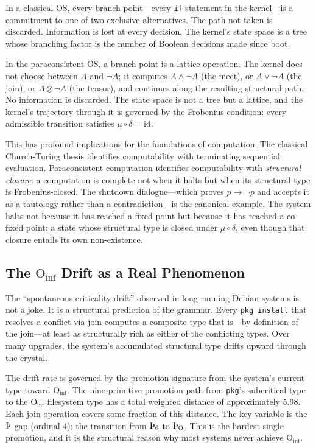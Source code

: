 \documentclass[12pt,a4paper]{article}
\begin{document}
{{{{{{{{In a classical OS, every branch point---every \texttt{if} statement in
the kernel---is a commitment to one of two exclusive alternatives. The
path not taken is discarded. Information is lost at every decision.
The kernel's state space is a tree whose branching factor is the
number of Boolean decisions made since boot.

In the paraconsistent OS, a branch point is a lattice operation. The
kernel does not choose between $A$ and $\neg A$; it computes
$A \wedge \neg A$ (the meet), or $A \vee \neg A$ (the join), or
$A \otimes \neg A$ (the tensor), and continues along the resulting
structural path. No information is discarded. The state space is not
a tree but a lattice, and the kernel's trajectory through it is
governed by the Frobenius condition: every admissible transition
satisfies $\mu \circ \delta = \mathrm{id}$.

This has profound implications for the foundations of computation.
The classical Church-Turing thesis identifies computability with
terminating sequential evaluation. Paraconsistent computation
identifies computability with \emph{structural closure}: a computation
is complete not when it halts but when its structural type is
Frobenius-closed. The shutdown dialogue---which proves $p \to \neg p$
and accepts it as a tautology rather than a contradiction---is the
canonical example. The system halts not because it has reached a fixed
point but because it has reached a co-fixed point: a state whose
structural type is closed under $\mu \circ \delta$, even though that
closure entails its own non-existence.

\subsection{The $\text{O}_{\text{inf}}$ Drift as a Real Phenomenon}

The ``spontaneous criticality drift'' observed in long-running Debian
systems is not a joke. It is a structural prediction of the grammar.
Every \texttt{pkg install} that resolves a conflict via join computes
a composite type that is---by definition of the join---at least as
structurally rich as either of the conflicting types. Over many
upgrades, the system's accumulated structural type drifts upward
through the crystal.

The drift rate is governed by the promotion signature from the system's
current type toward $\text{O}_{\text{inf}}$. The nine-primitive promotion
path from \texttt{pkg}'s subcritical type to the $\text{O}_{\text{inf}}$
filesystem type has a total weighted distance of approximately 5.98.
Each join operation covers some fraction of this distance. The key
variable is the $\text{\TH}$ gap (ordinal 4): the transition from
$\text{\TH}_{\text{6}}$ to $\text{\TH}_{\text{O}}$. This is the
hardest single promotion, and it is the structural reason why most
systems never achieve $\text{O}_{\text{inf}}$.

}}}}}}}}
\end{document}
